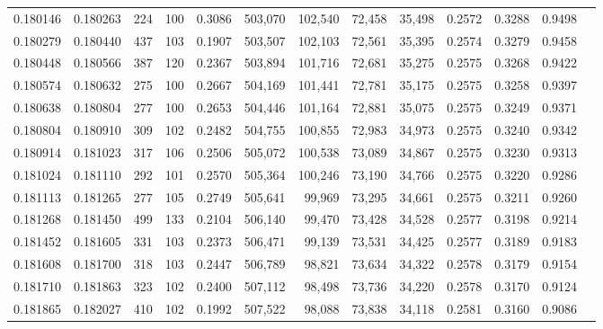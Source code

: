 \begin{tabular}{rrrrrrrrrrrrr}
0.180146 & 0.180263 &   224 & 100 &                                     0.3086 & 503,070 & 102,540 &  72,458 &  35,498 & 0.2572 & 0.3288 & 0.9498 \\
0.180279 & 0.180440 &   437 & 103 &                                     0.1907 & 503,507 & 102,103 &  72,561 &  35,395 & 0.2574 & 0.3279 & 0.9458 \\
0.180448 & 0.180566 &   387 & 120 &                                     0.2367 & 503,894 & 101,716 &  72,681 &  35,275 & 0.2575 & 0.3268 & 0.9422 \\
0.180574 & 0.180632 &   275 & 100 &                                     0.2667 & 504,169 & 101,441 &  72,781 &  35,175 & 0.2575 & 0.3258 & 0.9397 \\
0.180638 & 0.180804 &   277 & 100 &                                     0.2653 & 504,446 & 101,164 &  72,881 &  35,075 & 0.2575 & 0.3249 & 0.9371 \\
0.180804 & 0.180910 &   309 & 102 &                                     0.2482 & 504,755 & 100,855 &  72,983 &  34,973 & 0.2575 & 0.3240 & 0.9342 \\
0.180914 & 0.181023 &   317 & 106 &                                     0.2506 & 505,072 & 100,538 &  73,089 &  34,867 & 0.2575 & 0.3230 & 0.9313 \\
0.181024 & 0.181110 &   292 & 101 &                                     0.2570 & 505,364 & 100,246 &  73,190 &  34,766 & 0.2575 & 0.3220 & 0.9286 \\
0.181113 & 0.181265 &   277 & 105 &                                     0.2749 & 505,641 &  99,969 &  73,295 &  34,661 & 0.2575 & 0.3211 & 0.9260 \\
0.181268 & 0.181450 &   499 & 133 &                                     0.2104 & 506,140 &  99,470 &  73,428 &  34,528 & 0.2577 & 0.3198 & 0.9214 \\
0.181452 & 0.181605 &   331 & 103 &                                     0.2373 & 506,471 &  99,139 &  73,531 &  34,425 & 0.2577 & 0.3189 & 0.9183 \\
0.181608 & 0.181700 &   318 & 103 &                                     0.2447 & 506,789 &  98,821 &  73,634 &  34,322 & 0.2578 & 0.3179 & 0.9154 \\
0.181710 & 0.181863 &   323 & 102 &                                     0.2400 & 507,112 &  98,498 &  73,736 &  34,220 & 0.2578 & 0.3170 & 0.9124 \\
0.181865 & 0.182027 &   410 & 102 &                                     0.1992 & 507,522 &  98,088 &  73,838 &  34,118 & 0.2581 & 0.3160 & 0.9086 \\

\end{tabular}
